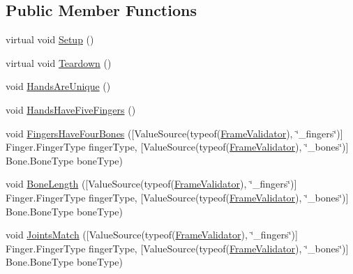 \subsection*{Public Member Functions}
\begin{DoxyCompactItemize}
\item 
virtual void \mbox{\hyperlink{class_leap_1_1_unity_1_1_tests_1_1_frame_validator_acd752e5e046ca556db0336d60df08941}{Setup}} ()
\item 
virtual void \mbox{\hyperlink{class_leap_1_1_unity_1_1_tests_1_1_frame_validator_af7d4444c63569def2bd38930563238ee}{Teardown}} ()
\item 
void \mbox{\hyperlink{class_leap_1_1_unity_1_1_tests_1_1_frame_validator_ac68295024dab243f9b07c3dde5b6ef83}{Hands\+Are\+Unique}} ()
\item 
void \mbox{\hyperlink{class_leap_1_1_unity_1_1_tests_1_1_frame_validator_ab5dccd3893a86f0942bbabfb598c8617}{Hands\+Have\+Five\+Fingers}} ()
\item 
void \mbox{\hyperlink{class_leap_1_1_unity_1_1_tests_1_1_frame_validator_a918c59aec010758d457bc76c841bb2ea}{Fingers\+Have\+Four\+Bones}} (\mbox{[}Value\+Source(typeof(\mbox{\hyperlink{class_leap_1_1_unity_1_1_tests_1_1_frame_validator}{Frame\+Validator}}), \char`\"{}\+\_\+fingers\char`\"{})\mbox{]} Finger.\+Finger\+Type finger\+Type, \mbox{[}Value\+Source(typeof(\mbox{\hyperlink{class_leap_1_1_unity_1_1_tests_1_1_frame_validator}{Frame\+Validator}}), \char`\"{}\+\_\+bones\char`\"{})\mbox{]} Bone.\+Bone\+Type bone\+Type)
\item 
void \mbox{\hyperlink{class_leap_1_1_unity_1_1_tests_1_1_frame_validator_a7938771f1e92c2be05903222ad872182}{Bone\+Length}} (\mbox{[}Value\+Source(typeof(\mbox{\hyperlink{class_leap_1_1_unity_1_1_tests_1_1_frame_validator}{Frame\+Validator}}), \char`\"{}\+\_\+fingers\char`\"{})\mbox{]} Finger.\+Finger\+Type finger\+Type, \mbox{[}Value\+Source(typeof(\mbox{\hyperlink{class_leap_1_1_unity_1_1_tests_1_1_frame_validator}{Frame\+Validator}}), \char`\"{}\+\_\+bones\char`\"{})\mbox{]} Bone.\+Bone\+Type bone\+Type)
\item 
void \mbox{\hyperlink{class_leap_1_1_unity_1_1_tests_1_1_frame_validator_afa4f4cab5e0011f2b69b2d7f4f361fb0}{Joints\+Match}} (\mbox{[}Value\+Source(typeof(\mbox{\hyperlink{class_leap_1_1_unity_1_1_tests_1_1_frame_validator}{Frame\+Validator}}), \char`\"{}\+\_\+fingers\char`\"{})\mbox{]} Finger.\+Finger\+Type finger\+Type, \mbox{[}Value\+Source(typeof(\mbox{\hyperlink{class_leap_1_1_unity_1_1_tests_1_1_frame_validator}{Frame\+Validator}}), \char`\"{}\+\_\+bones\char`\"{})\mbox{]} Bone.\+Bone\+Type bone\+Type)

\end{DoxyCompactItemize}
